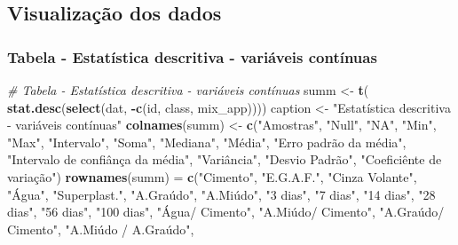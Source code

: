 \documentclass[]{article}
\newenvironment{Shaded}{\begin{snugshade}}{\end{snugshade}}
\newcommand{\CommentTok}[1]{\textcolor[rgb]{0.56,0.35,0.01}{\textit{#1}}}
\newcommand{\KeywordTok}[1]{\textcolor[rgb]{0.13,0.29,0.53}{\textbf{#1}}}
\newcommand{\NormalTok}[1]{#1}
\newcommand{\OperatorTok}[1]{\textcolor[rgb]{0.81,0.36,0.00}{\textbf{#1}}}
\newcommand{\StringTok}[1]{\textcolor[rgb]{0.31,0.60,0.02}{#1}}
\begin{document}
\hypertarget{visualizauxe7uxe3o-dos-dados-1}{%
\subsection{Visualização dos
dados}\label{visualizauxe7uxe3o-dos-dados-1}}

\hypertarget{tabela---estatuxedstica-descritiva---variuxe1veis-contuxednuas}{%
\subsubsection{Tabela - Estatística descritiva - variáveis
contínuas}\label{tabela---estatuxedstica-descritiva---variuxe1veis-contuxednuas}}

\label{show-stat-summ}

\begin{Shaded}
\begin{Highlighting}[]
\CommentTok{# Tabela - Estatística descritiva - variáveis contínuas}
\NormalTok{summ <-}\StringTok{ }\KeywordTok{t}\NormalTok{(}
  \KeywordTok{stat.desc}\NormalTok{(}\KeywordTok{select}\NormalTok{(dat, }\OperatorTok{-}\KeywordTok{c}\NormalTok{(id, class, mix_app))))}
\NormalTok{caption <-}\StringTok{ "Estatística descritiva - variáveis contínuas"}
\KeywordTok{colnames}\NormalTok{(summ) <-}\StringTok{ }\KeywordTok{c}\NormalTok{(}\StringTok{"Amostras"}\NormalTok{, }\StringTok{"Null"}\NormalTok{, }\StringTok{"NA"}\NormalTok{, }\StringTok{"Min"}\NormalTok{, }\StringTok{"Max"}\NormalTok{, }\StringTok{"Intervalo"}\NormalTok{,}
              \StringTok{"Soma"}\NormalTok{, }\StringTok{"Mediana"}\NormalTok{, }\StringTok{"Média"}\NormalTok{, }\StringTok{"Erro padrão  da média"}\NormalTok{, }
              \StringTok{"Intervalo de confiânça da média"}\NormalTok{,}
              \StringTok{"Variância"}\NormalTok{, }\StringTok{"Desvio Padrão"}\NormalTok{, }\StringTok{"Coeficiênte de variação"}\NormalTok{)}
\KeywordTok{rownames}\NormalTok{(summ) =}\StringTok{ }\KeywordTok{c}\NormalTok{(}\StringTok{"Cimento"}\NormalTok{, }\StringTok{"E.G.A.F."}\NormalTok{, }\StringTok{"Cinza Volante"}\NormalTok{, }\StringTok{"Água"}\NormalTok{,}
              \StringTok{"Superplast."}\NormalTok{, }\StringTok{"A.Graúdo", "}\NormalTok{A.Miúdo", }\StringTok{"3 dias"}\NormalTok{, }\StringTok{"7 dias"}\NormalTok{,}
              \StringTok{"14 dias"}\NormalTok{, }\StringTok{"28 dias"}\NormalTok{, }\StringTok{"56 dias"}\NormalTok{, }\StringTok{"100 dias"}\NormalTok{,}
              \StringTok{"Água/ Cimento"}\NormalTok{, }\StringTok{"A.Miúdo/ Cimento"}\NormalTok{, }
              \StringTok{"A.Graúdo/ Cimento"}\NormalTok{, }\StringTok{"A.Miúdo / A.Graúdo",}

\end{Highlighting}
\end{Shaded}
\end{document}
